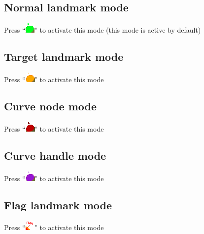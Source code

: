 \subsection{Normal landmark mode}	
Press ``\includegraphics[scale=0.7]{images/04/normal_landmarks.png}" to activate this mode (this mode is active by default)

\subsection{Target landmark mode}	
Press ``\includegraphics[scale=0.7]{images/04/target_landmarks.png}"  to activate this mode

\subsection{Curve node mode}	
Press ``\includegraphics[scale=0.7]{images/04/curve_nodes.png}" to activate this mode 

\subsection{Curve handle mode}	
Press ``\includegraphics[scale=0.7]{images/04/curve_handles.png}"  to activate this mode


\subsection{Flag landmark mode}	
Press ``\includegraphics[scale=0.7]{images/04/flag_landmarks.png}" to activate this mode


